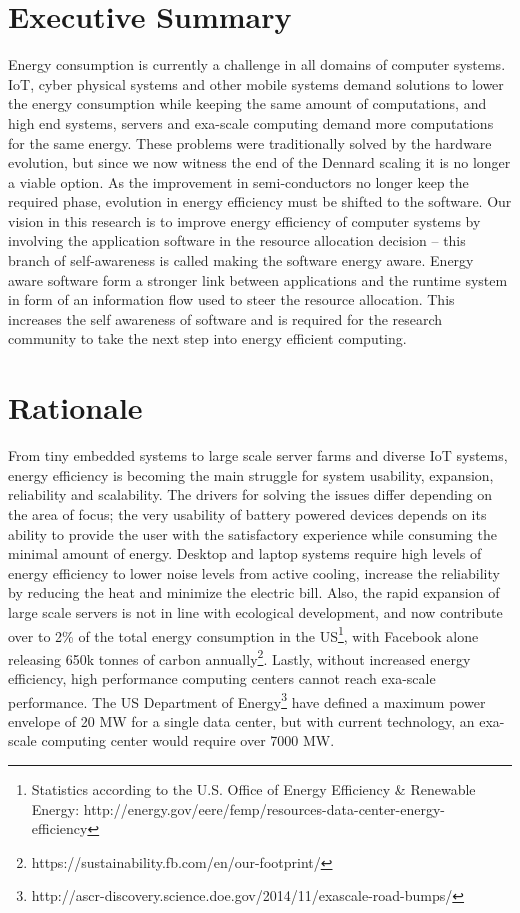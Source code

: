 \documentclass{article}
\begin{document}
\section{Executive Summary}
Energy consumption is currently a challenge in all domains of computer systems.
IoT, cyber physical systems and other mobile systems demand solutions to lower the energy consumption while keeping the same amount of computations,
and high end systems, servers and exa-scale computing demand more computations for the same energy.
These problems were traditionally solved by the hardware evolution, but since we now witness the end of the Dennard scaling \cite{Dennard:74} it is no longer a viable option.
As the improvement in semi-conductors no longer keep the required phase, evolution in energy efficiency must be shifted to the software.
Our vision in this research is to improve energy efficiency of computer systems by involving the application software in the resource allocation decision -- this branch of self-awareness is called making the software energy aware.
Energy aware software form a stronger link between applications and the runtime system in form of an information flow used to steer the resource allocation.
This increases the self awareness of software and is required for the research community to take the next step into energy efficient computing.

\section{Rationale}
From tiny embedded systems to large scale server farms and diverse IoT systems, energy efficiency is becoming the main struggle for system usability, expansion, reliability and scalability.
The drivers for solving the issues differ depending on the area of focus;
the very usability of battery powered devices depends on its ability to provide the user with the satisfactory experience while consuming the minimal amount of energy.
Desktop and laptop systems require high levels of energy efficiency to lower noise levels from active cooling, increase the reliability by reducing the heat and minimize the electric bill.
Also, the rapid expansion of large scale servers is not in line with ecological development, and now contribute over to 2\% of the total energy consumption in the US\footnote{Statistics according to the U.S. Office of Energy Efficiency \& Renewable Energy: http://energy.gov/eere/femp/resources-data-center-energy-efficiency}, with Facebook alone releasing 650k tonnes of carbon annually\footnote{https://sustainability.fb.com/en/our-footprint/}.
Lastly, without increased energy efficiency, high performance computing centers cannot reach exa-scale performance.
The US Department of Energy\footnote{http://ascr-discovery.science.doe.gov/2014/11/exascale-road-bumps/} have defined a maximum power envelope of 20 MW for a single data center, but with current technology, an exa-scale computing center would require over 7000 MW.\smallskip
\end{document}
